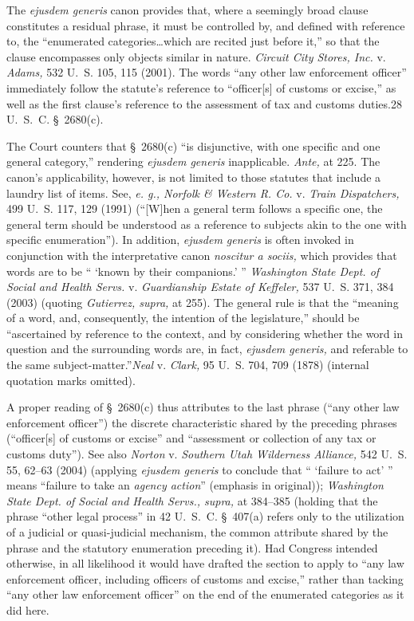   The \emph{ejusdem generis} canon provides that, where a seemingly broad clause constitutes a residual phrase, it must be controlled by, and defined with reference to, the ``enumerated categories\dots which are recited just before it,'' so that the clause encompasses only objects similar in nature. \emph{Circuit City Stores, Inc.} v. \emph{Adams,} 532 U.~S. 105, 115 (2001). The words ``any other law enforcement officer'' immediately follow the statute's reference to ``officer[s] of customs or excise,'' as well as the first clause's reference to the assessment of tax and customs duties.28 U.~S.~C. \S~2680(c).

  The Court counters that \S~2680(c) ``is disjunctive, with one specific and one general category,'' rendering \emph{ejusdem generis} inapplicable. \emph{Ante,} at 225. The canon's applicability, however, is not limited to those statutes that include a laundry list of items. See, \emph{e. g., Norfolk \& Western R. Co.} v. \emph{Train Dispatchers,} 499 U.~S. 117, 129 (1991) (``[W]hen a general term follows a specific one, the general term should be understood as a reference to subjects akin to the one with specific enumeration''). In addition, \emph{ejusdem generis} is often invoked in conjunction with the interpretative canon \emph{noscitur a sociis,} which provides that words are to be `` ‘known by their companions.' '' \emph{Washington State Dept. of Social and Health Servs.} v. \emph{Guardianship Estate of Keffeler,} 537 U.~S. 371, 384 (2003) (quoting \emph{Gutierrez, supra,} at 255). The general rule is that the ``meaning of a word, and, consequently, the intention of the legislature,'' should be ``ascertained by reference to the context, and by considering whether the word in question and the surrounding words are, in fact, \emph{ejusdem generis,} and referable to the same subject-matter.''\emph{Neal} v. \emph{Clark,} 95 U.~S. 704, 709 (1878) (internal quotation marks omitted).\newpage 

  A proper reading of \S~2680(c) thus attributes to the last phrase (``any other law enforcement officer'') the discrete characteristic shared by the preceding phrases (``officer[s] of customs or excise'' and ``assessment or collection of any tax or customs duty''). See also \emph{Norton} v. \emph{Southern Utah Wilderness Alliance,} 542 U.~S. 55, 62--63 (2004) (applying \emph{ejusdem generis} to conclude that `` ‘failure to act' '' means ``failure to take an \emph{agency action}'' (emphasis in original)); \emph{Washington State Dept. of Social and Health Servs., supra,} at 384--385 (holding that the phrase ``other legal process'' in 42 U.~S.~C. \S~407(a) refers only to the utilization of a judicial or quasi-judicial mechanism, the common attribute shared by the phrase and the statutory enumeration preceding it). Had Congress intended otherwise, in all likelihood it would have drafted the section to apply to ``any law enforcement officer, including officers of customs and excise,'' rather than tacking ``any other law enforcement officer'' on the end of the enumerated categories as it did here.

